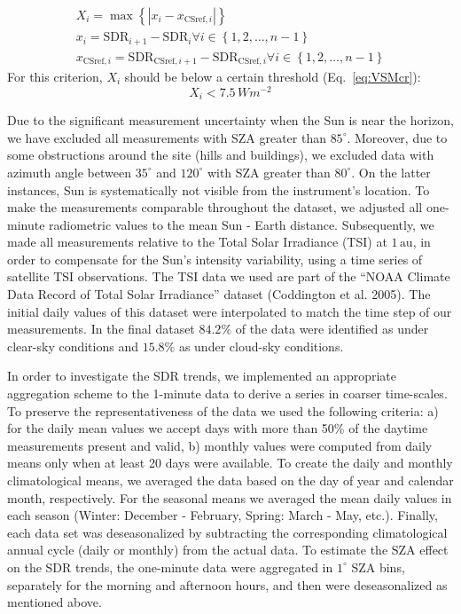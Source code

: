 \documentclass[
  preprint, 3p, authoryear]{article}
\begin{document}
\begin{enumerate}
  \begin{gather}
    X_i = \max{\left \{ \left | x_i - x_{\text{CSref},i} \right | \right \}} \label{eq:VSM3} \\
    x_i = \text{SDR}_{i+1} - \text{SDR}_{i} \forall i \in \left \{ 1, 2, \ldots, n-1 \right \} \label{eq:VSM1} \\
    x_{\text{CSref},i} = \text{SDR}_{\text{CSref},i+1} - \text{SDR}_{\text{CSref},i} \forall i \in \left \{ 1, 2, \ldots, n-1 \right \} \label{eq:VSM2}
  \end{gather}
  For this criterion, \(X_i\) should be below a certain threshold (Eq.~\ref{eq:VSMcr}):
  \begin{equation}
    X_i < 7.5\,Wm^{-2} \label{eq:VSMcr}
  \end{equation}
\end{enumerate}

Due to the significant measurement uncertainty when the Sun is near the horizon, we have excluded all measurements with SZA greater than \(85^\circ\).
Moreover, due to some obstructions around the site (hills and buildings), we excluded data with azimuth angle between
\(35^\circ\) and \(120^\circ\) with SZA greater than \(80^\circ\).
On the latter instances, Sun is systematically not visible from the instrument's location.
To make the measurements comparable throughout the dataset, we adjusted all one-minute radiometric values to the mean Sun - Earth distance.
Subsequently, we made all measurements relative to the Total Solar Irradiance (TSI) at \(1\,\text{au}\), in order to compensate for the Sun's intensity variability, using a time series of satellite TSI observations.
The TSI data we used are part of the ``NOAA Climate Data Record of Total Solar Irradiance'' dataset (Coddington et al. 2005).
The initial daily values of this dataset were interpolated to match the time step of our measurements.
In the final dataset
\(84.2\%\)
of the data were identified as under clear-sky conditions and
\(15.8\%\)
as under cloud-sky conditions.

In order to investigate the SDR trends, we implemented an appropriate aggregation scheme to the 1-minute data to derive a series in coarser time-scales.
To preserve the representativeness of the data we used the following criteria:
a) for the daily mean values we accept days with more than 50\% of the daytime measurements present and valid,
b) monthly values were computed from daily means
only when at least 20 days were available.
To create the daily and monthly climatological means, we averaged the data based on the day of year and calendar month, respectively.
For the seasonal means we averaged the mean daily values in each season (Winter: December - February, Spring: March - May, etc.).
Finally, each data set was deseasonalized by subtracting the corresponding climatological annual cycle (daily or monthly) from the actual data.
To estimate the SZA effect on the SDR trends, the one-minute data were aggregated in \(1^\circ\) SZA bins, separately for the morning and afternoon hours, and then were deseasonalized as mentioned above.
\end{document}
